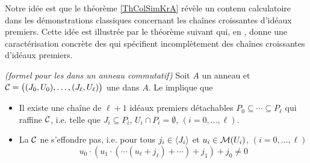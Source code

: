 Notre idée est que le théorème \ref{ThColSimKrA} révèle un 
contenu calculatoire  dans les démonstrations classiques concernant les 
chaînes croissantes d'idéaux premiers. Cette idée est illustrée
par le théorème suivant qui, en \clama, donne une caractérisation
concrète des \procs qui spécifient incomplètement des chaînes 
croissantes d'idéaux premiers.
 
\begin{theorem} 
\label{th.nstformel} {\em (\nst formel pour les \procs dans un anneau commutatif)}  
Soit $A$ un anneau et 
${\cal C}=\big((J_0,U_0),\ldots,(J_\ell,U_\ell)\big)$ une \proc dans $A$. Le \tcg implique 
que \propeq
\begin{itemize}
\item [$(a)$] Il existe une chaîne de $\ell+1$ idéaux premiers détachables 
$P_0\subseteq \cdots\subseteq P_\ell$  qui raffine ${\cal C}$, i.e. telle que
 $J_i\subseteq P_i$, $U_i\cap P_i=\emptyset $, $(i=0,\ldots,\ell)$. 
\item [$(b)$] La \proc ${\cal C}$ ne s'effondre pas, i.e. pour tous $j_i\in \left\langle{J_i }\right\rangle$ et $u_i\in{\cal M}(U_i)$, 
$(i=0,\ldots,\ell)$  
$$u_0\cdot(u_1\cdot(\cdots(u_\ell+j_\ell)+\cdots)+j_1)+j_0\neq 0 
$$
\end{itemize}
\end{theorem}
 
